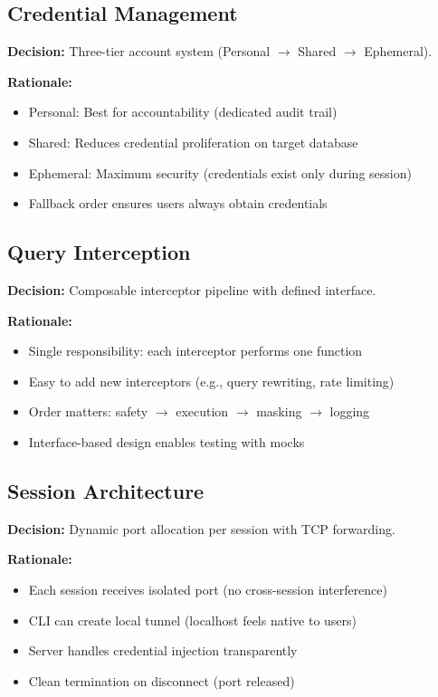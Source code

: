 \subsection{Credential Management}

\textbf{Decision:} Three-tier account system (Personal $\rightarrow$ Shared $\rightarrow$ Ephemeral).

\textbf{Rationale:}
\begin{itemize}
    \item Personal: Best for accountability (dedicated audit trail)
    \item Shared: Reduces credential proliferation on target database
    \item Ephemeral: Maximum security (credentials exist only during session)
    \item Fallback order ensures users always obtain credentials
\end{itemize}

\subsection{Query Interception}

\textbf{Decision:} Composable interceptor pipeline with defined interface.

\textbf{Rationale:}
\begin{itemize}
    \item Single responsibility: each interceptor performs one function
    \item Easy to add new interceptors (e.g., query rewriting, rate limiting)
    \item Order matters: safety $\rightarrow$ execution $\rightarrow$ masking $\rightarrow$ logging
    \item Interface-based design enables testing with mocks
\end{itemize}

\subsection{Session Architecture}

\textbf{Decision:} Dynamic port allocation per session with TCP forwarding.

\textbf{Rationale:}
\begin{itemize}
    \item Each session receives isolated port (no cross-session interference)
    \item CLI can create local tunnel (localhost feels native to users)
    \item Server handles credential injection transparently
    \item Clean termination on disconnect (port released)
\end{itemize}

